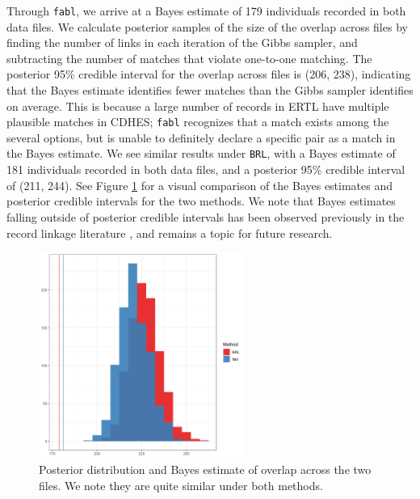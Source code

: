 \documentclass[ba]{imsart}
\begin{document}
	Through \texttt{fabl}, we arrive at a Bayes estimate of 179 individuals recorded in both data files. We calculate posterior samples of the size of the overlap across files by finding the number of links in each iteration of the Gibbs sampler, and subtracting the number of matches that violate one-to-one matching. The posterior 95\% credible interval for the overlap across files is (206, 238), indicating that the Bayes estimate identifies fewer matches than the Gibbs sampler identifies on average. This is because a large number of records in ERTL have multiple plausible matches in CDHES; \texttt{fabl} recognizes that a match exists among the several options, but is unable to definitely declare a specific pair as a match in the Bayes estimate. We see similar results under \texttt{BRL}, with a Bayes estimate of 181 individuals recorded in both data files, and a posterior 95\% credible interval of (211, 244). See Figure \ref{fig:overlap-plot} for a visual comparison of the Bayes estimates and posterior credible intervals for the two methods. We note that Bayes estimates falling outside of posterior credible intervals has been observed previously in the record linkage literature \citep{sadinle_bayesian_2017, steorts_bayesian_2016}, and remains a topic for future research.
	
	
	
	\begin{figure}[t]
		\begin{center}
			\includegraphics[width=0.6\textwidth]{../notes/figures/el_salvador/overlap_distribution_smallP_bayes}
			\caption{Posterior distribution and Bayes estimate of overlap across the two files. We note they are quite similar under both methods.}
			\label{fig:overlap-plot}
		\end{center}
	\end{figure}
	
\end{document}
